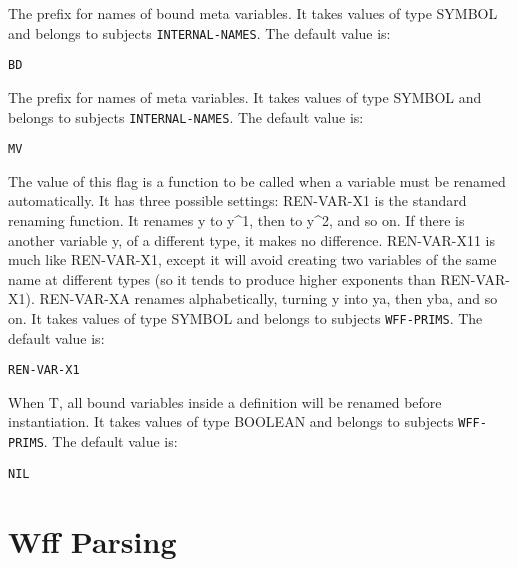 \begin{description} 
\item[META-BDVAR-NAME]  
The prefix for names of bound meta variables.
It takes values of type SYMBOL and belongs to subjects \texttt{INTERNAL-NAMES}.  The default value is: \begin{lstlisting}
BD
\end{lstlisting}

\item[META-VAR-NAME]  
The prefix for names of meta variables.
It takes values of type SYMBOL and belongs to subjects \texttt{INTERNAL-NAMES}.  The default value is: \begin{lstlisting}
MV
\end{lstlisting}

\item[REN-VAR-FN]  
The value of this flag is a function to be called when a variable
must be renamed automatically. It has three possible settings:
REN-VAR-X1 is the standard renaming function. It renames y to y\textasciicircum 1,
 then to y\textasciicircum 2, and so on. If there is another variable y, of a different 
 type, it makes no difference.
REN-VAR-X11 is much like REN-VAR-X1, except it will avoid creating
 two variables of the same name at different types (so it tends to 
 produce higher exponents than REN-VAR-X1).
REN-VAR-XA renames alphabetically, turning y into ya, then yba, 
 and so on.
It takes values of type SYMBOL and belongs to subjects \texttt{WFF-PRIMS}.  The default value is: \begin{lstlisting}
REN-VAR-X1
\end{lstlisting}

\item[RENAME-ALL-BD-VARS]  
When T, all bound variables inside a definition will be
renamed before instantiation.
It takes values of type BOOLEAN and belongs to subjects \texttt{WFF-PRIMS}.  The default value is: \begin{lstlisting}
NIL
\end{lstlisting}

\item
\end{description}

\section{Wff Parsing}

